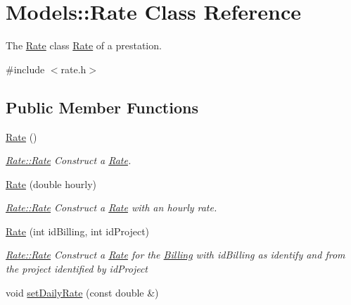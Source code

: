 \hypertarget{classModels_1_1Rate}{}\section{Models\+:\+:Rate Class Reference}
\label{classModels_1_1Rate}


The \hyperlink{classModels_1_1Rate}{Rate} class \hyperlink{classModels_1_1Rate}{Rate} of a prestation.  




{\ttfamily \#include $<$rate.\+h$>$}

\subsection*{Public Member Functions}
\begin{DoxyCompactItemize}
\item 
\hypertarget{classModels_1_1Rate_a609460ae8c48027ed4ac1aaac416f690}{}\hyperlink{classModels_1_1Rate_a609460ae8c48027ed4ac1aaac416f690}{Rate} ()\label{classModels_1_1Rate_a609460ae8c48027ed4ac1aaac416f690}

\begin{DoxyCompactList}\small\item\em \hyperlink{classModels_1_1Rate_a609460ae8c48027ed4ac1aaac416f690}{Rate\+::\+Rate} Construct a \hyperlink{classModels_1_1Rate}{Rate}. \end{DoxyCompactList}\item 
\hyperlink{classModels_1_1Rate_ad2d770be11eb899e8bcf673ed462836e}{Rate} (double hourly)
\begin{DoxyCompactList}\small\item\em \hyperlink{classModels_1_1Rate_a609460ae8c48027ed4ac1aaac416f690}{Rate\+::\+Rate} Construct a \hyperlink{classModels_1_1Rate}{Rate} with an hourly rate. \end{DoxyCompactList}\item 
\hyperlink{classModels_1_1Rate_ab867d2b5b114df71814c742c957badd8}{Rate} (int id\+Billing, int id\+Project)
\begin{DoxyCompactList}\small\item\em \hyperlink{classModels_1_1Rate_a609460ae8c48027ed4ac1aaac416f690}{Rate\+::\+Rate} Construct a \hyperlink{classModels_1_1Rate}{Rate} for the \hyperlink{classModels_1_1Billing}{Billing} with {\itshape id\+Billing} as identify and from the project identified by {\itshape id\+Project} \end{DoxyCompactList}\item 
\hypertarget{classModels_1_1Rate_a2f07614aa1d1a4957fd8d4de4d3680d5}{}void \hyperlink{classModels_1_1Rate_a2f07614aa1d1a4957fd8d4de4d3680d5}{set\+Daily\+Rate} (const double \&)\label{classModels_1_1Rate_a2f07614aa1d1a4957fd8d4de4d3680d5}


\end{DoxyCompactItemize}
